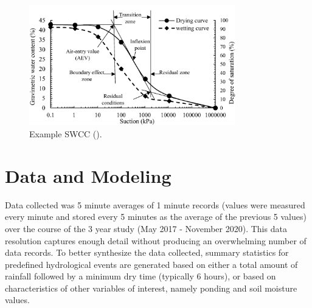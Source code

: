 \begin{figure}[ht]
	\centering
	\includegraphics[width=0.8\textwidth]{gfx/chapter-data-analysis/swcc.jpg}
	\caption[Example SWCC.]{Example SWCC (\cite{Eyo2020}).}
	\label{fig:swcc-example}
\end{figure}

\section{Data and Modeling}
Data collected was 5 minute averages of 1 minute records (values were measured every minute and stored every 5 minutes as the average of the previous 5 values) over the course of the 3 year study (May 2017 - November 2020).
This data resolution captures enough detail without producing an overwhelming number of data records.
To better synthesize the data collected, summary statistics for predefined hydrological events are generated based on either a total amount of rainfall followed by a minimum dry time (typically 6 hours), or based on characteristics of other variables of interest, namely ponding and soil moisture values.

